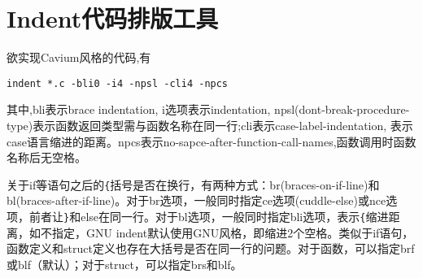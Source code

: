 \section{Indent代码排版工具}

欲实现Cavium风格的代码,有
\begin{verbatim}
indent *.c -bli0 -i4 -npsl -cli4 -npcs
\end{verbatim}

其中,bli表示brace indentation, i选项表示indentation, npsl(dont-break-procedure-type)表示函数返回类型需与函数名称在同一行;cli表示case-label-indentation, 表示case语言缩进的距离。npcs表示no-sapce-after-function-call-names,函数调用时函数名称后无空格。

关于if等语句之后的\verb+{+括号是否在换行，有两种方式：br(braces-on-if-line)和bl(braces-after-if-line)。对于br选项，一般同时指定ce选项(cuddle-else)或nce选项，前者让\verb+}+和else在同一行。对于bl选项，一般同时指定bli选项，表示\verb+{+缩进距离，如不指定，GNU indent默认使用GNU风格，即缩进2个空格。类似于if语句，函数定义和struct定义也存在大括号是否在同一行的问题。对于函数，可以指定brf或blf（默认）；对于struct，可以指定brs和blf。
